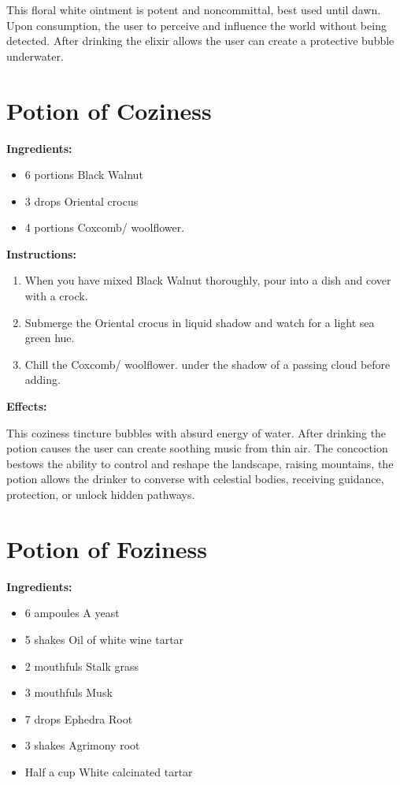 \documentclass{article}
\begin{document}
This floral white ointment is potent and noncommittal, best used until dawn. Upon consumption, the user to perceive and influence the world without being detected. After drinking the elixir allows the user can create a protective bubble underwater.

\newpage
\section*{Potion of Coziness}

\textbf{Ingredients:}

\begin{itemize}
  \item 6 portions Black Walnut
  \item 3 drops Oriental crocus
  \item 4 portions Coxcomb/ woolflower.
\end{itemize}

\textbf{Instructions:}

\begin{enumerate}
  \item When you have mixed Black Walnut thoroughly, pour into a dish and cover with a crock.
  \item Submerge the Oriental crocus in liquid shadow and watch for a light sea green hue.
  \item Chill the Coxcomb/ woolflower. under the shadow of a passing cloud before adding.
\end{enumerate}

\textbf{Effects:}

This coziness tincture bubbles with absurd energy of water. After drinking the potion causes the user can create soothing music from thin air. The concoction bestows the ability to control and reshape the landscape, raising mountains, the potion allows the drinker to converse with celestial bodies, receiving guidance, protection, or unlock hidden pathways.

\newpage
\section*{Potion of Foziness}

\textbf{Ingredients:}

\begin{itemize}
  \item 6 ampoules A yeast
  \item 5 shakes Oil of white wine tartar
  \item 2 mouthfuls Stalk grass
  \item 3 mouthfuls Musk
  \item 7 drops Ephedra Root
  \item 3 shakes Agrimony root
  \item Half a cup White calcinated tartar
\end{itemize}
\end{document}
